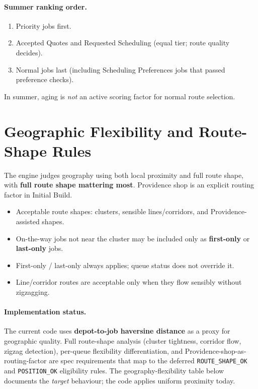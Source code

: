 \documentclass[12pt]{article}
\begin{document}
\paragraph{Summer ranking order.}
\begin{enumerate}
    \item Priority jobs first.
    \item Accepted Quotes and Requested Scheduling (equal tier; route quality decides).
    \item Normal jobs last (including Scheduling Preferences jobs that passed preference checks).
\end{enumerate}
In summer, aging is \emph{not} an active scoring factor for normal route selection.

\section*{Geographic Flexibility and Route-Shape Rules}
\label{sec:geography}

The engine judges geography using both local proximity and full route shape, with \textbf{full route shape mattering most}.
Providence shop is an explicit routing factor in Initial Build.

\begin{itemize}
    \item Acceptable route shapes: clusters, sensible lines/corridors, and Providence-assisted shapes.
    \item On-the-way jobs not near the cluster may be included only as \textbf{first-only} or \textbf{last-only} jobs.
    \item First-only / last-only always applies; queue status does not override it.
    \item Line/corridor routes are acceptable only when they flow sensibly without zigzagging.
\end{itemize}

\paragraph{Implementation status.}
The current code uses \textbf{depot-to-job haversine distance} as a proxy for geographic quality.
Full route-shape analysis (cluster tightness, corridor flow, zigzag detection), per-queue flexibility differentiation, and Providence-shop-as-routing-factor are spec requirements that map to the deferred \texttt{ROUTE\_SHAPE\_OK} and \texttt{POSITION\_OK} eligibility rules.
The geography-flexibility table below documents the \emph{target} behaviour; the code applies uniform proximity today.
\end{document}
